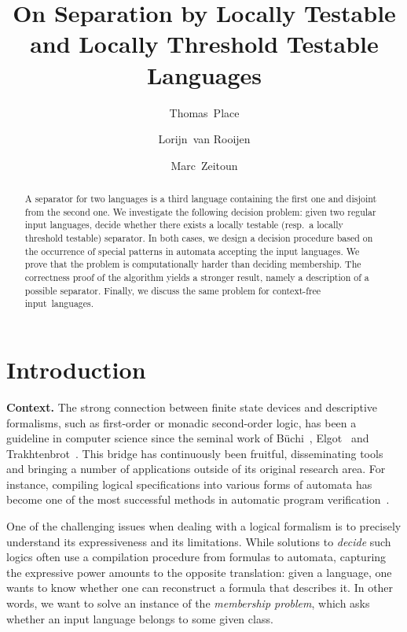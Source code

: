 \documentclass{LMCS}
\title[On Separation by LT and LTT]{On Separation by Locally Testable
  and Locally Threshold Testable Languages}
\author{Thomas~Place}
\author{Lorijn~van Rooijen}
\author{Marc~Zeitoun}
\newcommand\mypar[1]{\par\medskip\noindent\textbf{#1}}
\theoremstyle{plain}
\begin{document}
\begin{abstract}
  A separator for two languages is a third language containing the
  first one and disjoint from the second one. We investigate the
  following decision problem: given two regular input languages,
  decide whether there exists a locally testable (resp.\ a locally
  threshold testable) separator. In both cases, we design a decision
  procedure based on the occurrence of special patterns in automata
  accepting the input languages.  We prove that the problem is
  computationally harder than deciding membership. The correctness
  proof of the algorithm yields a stronger result, namely a
  description of a possible separator.  Finally, we discuss the same
  problem for context-free input~languages.
\end{abstract}

\maketitle

\section{Introduction}
\label{sec:intro}

\makeatletter{}\mypar{Context.} The strong connection between finite state devices
and descriptive formalisms, such as first-order or monadic
second-order logic, has been a guideline in computer science since the
seminal work of
B\"uchi~\cite{Buchi:Weak-Second-Order-Arithmetic-Finite:1960:a},
Elgot~\cite{Elgot:Decision-Problems-Finite-Automata:1961:a} and
Trakhtenbrot~\cite{Trakh61}.
This bridge has continuously
been fruitful, disseminating tools and bringing a number of
applications outside of its original research area. For instance,
compiling logical specifications into various forms of automata has
become one of the most successful methods in automatic program
verification~\cite{DBLP:conf/lics/VardiW86}.

One of the challenging issues when dealing with a logical formalism is to
precisely understand its expressiveness and its limitations. While
solutions to \emph{decide} such logics often use a compilation procedure from
formulas to automata, capturing the expressive power amounts to the
opposite translation: given a language, one wants to know whether one
can reconstruct a formula that describes it. In other words, we want
 to solve an instance of the \emph{membership problem}, which asks whether
an input language belongs to some given class.
\end{document}
